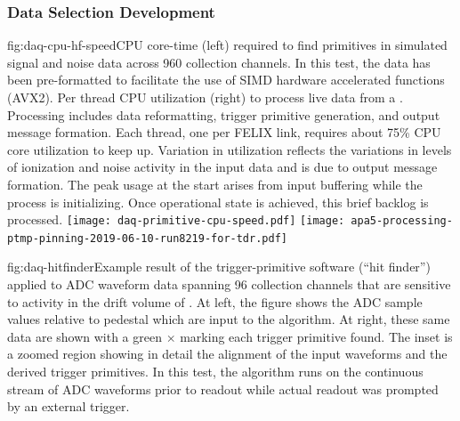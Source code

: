 \subsubsection{Data Selection Development}

\begin{dunefigure}{fig:daq-cpu-hf-speed}{CPU core-time (left) required to find primitives in simulated signal and noise data across 960 collection channels.
    In this test, the data has been pre-formatted to facilitate the use of SIMD hardware accelerated functions (AVX2). 
    Per thread CPU utilization (right) to process live data from a  .
    Processing includes data reformatting, trigger primitive generation, and output message formation.
    Each thread, one per FELIX link, requires about 75\% CPU core utilization to keep up.
    Variation in utilization reflects the variations in levels of ionization and noise activity in the input data and is due to output message formation.
    The peak usage at the start arises from input buffering while the process is initializing. 
    Once operational state is achieved, this brief backlog is processed.}
  \texttt{[image: daq-primitive-cpu-speed.pdf]}%
 \texttt{[image: apa5-processing-ptmp-pinning-2019-06-10-run8219-for-tdr.pdf]}
\end{dunefigure}

\begin{dunefigure}{fig:daq-hitfinder}{Example result of the trigger-primitive software (``hit finder'') applied to ADC waveform data spanning 96 collection channels that are sensitive to activity in the drift volume of . 
    At left, the figure shows the ADC sample values relative to pedestal which are input to the algorithm. 
    At right, these same data are shown with a green $\times$ marking each trigger primitive found. 
    The inset is a zoomed region showing in detail the alignment of the input waveforms and the derived trigger primitives.
    In this test, the algorithm runs on the continuous stream of ADC waveforms prior to readout while actual readout was prompted by an external trigger.}
\end{dunefigure}

